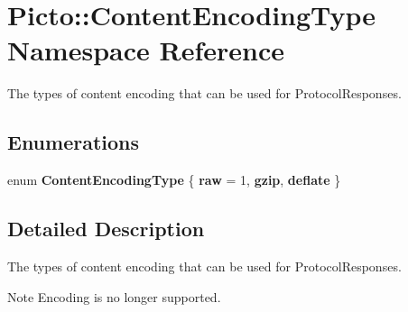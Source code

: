\hypertarget{namespace_picto_1_1_content_encoding_type}{\section{Picto\-:\-:Content\-Encoding\-Type Namespace Reference}
\label{namespace_picto_1_1_content_encoding_type}
}


The types of content encoding that can be used for Protocol\-Responses.  


\subsection*{Enumerations}
\begin{DoxyCompactItemize}
\item 
enum {\bfseries Content\-Encoding\-Type} \{ {\bfseries raw} = 1, 
{\bfseries gzip}, 
{\bfseries deflate}
 \}
\end{DoxyCompactItemize}


\subsection{Detailed Description}
The types of content encoding that can be used for Protocol\-Responses. \begin{DoxyNote}{Note}
Encoding is no longer supported. 
\end{DoxyNote}

